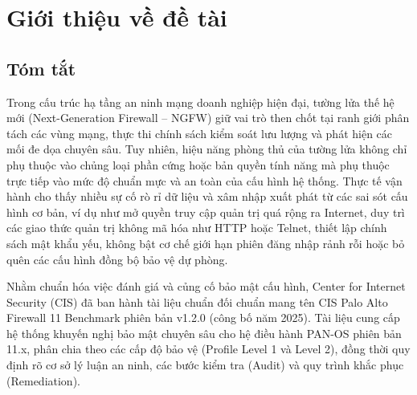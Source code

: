 \documentclass[12pt,a4paper]{article}
\makeatletter
\renewcommand{\lstlistoflistings}{%
  \begingroup
  \parskip\z@ \parindent\z@
  \section*{\centering\fontsize{21}{26}\selectfont\bfseries\color{UITBlue}\lstlistlistingname}%
  \noindent{\color{UITBlue}\rule{\textwidth}{1pt}}\par\vspace{0.4cm}
  \@starttoc{lol}%
  \endgroup
}
\renewcommand{\lstlistlistingname}{\makebox[\textwidth][c]{DANH MỤC MÃ NGUỒN}}
\makeatother
\begin{document}
\pagestyle{uit-toc}
\tableofcontents
\clearpage

\thispagestyle{uit-toc}
{}
\listoftables
\clearpage

\thispagestyle{uit-toc}
{}
\listoffigures
\clearpage

\thispagestyle{uit-toc}
{}
\lstlistoflistings
\clearpage

\pagestyle{fancy}

\section{Giới thiệu về đề tài}

\subsection{Tóm tắt}
\noindent Trong cấu trúc hạ tầng an ninh mạng doanh nghiệp hiện đại, tường lửa thế hệ mới (Next-Generation Firewall -- NGFW) giữ vai trò then chốt tại ranh giới phân tách các vùng mạng, thực thi chính sách kiểm soát lưu lượng và phát hiện các mối đe dọa chuyên sâu. Tuy nhiên, hiệu năng phòng thủ của tường lửa không chỉ phụ thuộc vào chủng loại phần cứng hoặc bản quyền tính năng mà phụ thuộc trực tiếp vào mức độ chuẩn mực và an toàn của cấu hình hệ thống. Thực tế vận hành cho thấy nhiều sự cố rò rỉ dữ liệu và xâm nhập xuất phát từ các sai sót cấu hình cơ bản, ví dụ như mở quyền truy cập quản trị quá rộng ra Internet, duy trì các giao thức quản trị không mã hóa như HTTP hoặc Telnet, thiết lập chính sách mật khẩu yếu, không bật cơ chế giới hạn phiên đăng nhập rảnh rỗi hoặc bỏ quên các cấu hình đồng bộ bảo vệ dự phòng.

\vspace{0.3cm}

\noindent Nhằm chuẩn hóa việc đánh giá và củng cố bảo mật cấu hình, Center for Internet Security (CIS) đã ban hành tài liệu chuẩn đối chuẩn mang tên CIS Palo Alto Firewall 11 Benchmark phiên bản v1.2.0 (công bố năm 2025). Tài liệu cung cấp hệ thống khuyến nghị bảo mật chuyên sâu cho hệ điều hành PAN-OS phiên bản 11.x, phân chia theo các cấp độ bảo vệ (Profile Level 1 và Level 2), đồng thời quy định rõ cơ sở lý luận an ninh, các bước kiểm tra (Audit) và quy trình khắc phục (Remediation).
\end{document}
